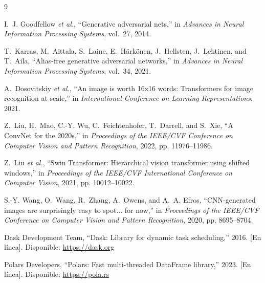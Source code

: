 \documentclass[10pt,twocolumn,letterpaper]{article}
\begin{document}
\begin{thebibliography}{9}
\small

I.~J. Goodfellow \emph{et al.}, ``Generative adversarial nets,'' in
\emph{Advances in Neural Information Processing Systems}, vol.~27, 2014.

T.~Karras, M.~Aittala, S.~Laine, E.~Härkönen, J.~Hellsten, J.~Lehtinen, and
T.~Aila, ``Alias-free generative adversarial networks,'' in \emph{Advances
in Neural Information Processing Systems}, vol.~34, 2021.

A.~Dosovitskiy \emph{et al.}, ``An image is worth 16x16 words: Transformers
for image recognition at scale,'' in \emph{International Conference on
Learning Representations}, 2021.

Z.~Liu, H.~Mao, C.-Y. Wu, C.~Feichtenhofer, T.~Darrell, and S.~Xie, ``A
ConvNet for the 2020s,'' in \emph{Proceedings of the IEEE/CVF Conference on
Computer Vision and Pattern Recognition}, 2022, pp. 11976--11986.

Z.~Liu \emph{et al.}, ``Swin Transformer: Hierarchical vision transformer
using shifted windows,'' in \emph{Proceedings of the IEEE/CVF International
Conference on Computer Vision}, 2021, pp. 10012--10022.

S.-Y. Wang, O.~Wang, R.~Zhang, A.~Owens, and A.~A. Efros, ``CNN-generated
images are surprisingly easy to spot... for now,'' in \emph{Proceedings of
the IEEE/CVF Conference on Computer Vision and Pattern Recognition}, 2020,
pp. 8695--8704.

Dask Development Team, ``Dask: Library for dynamic task scheduling,'' 2016.
[En línea]. Disponible: \url{https://dask.org}

Polars Developers, ``Polars: Fast multi-threaded DataFrame library,'' 2023.
[En línea]. Disponible: \url{https://pola.rs}

\end{thebibliography}
\end{document}
